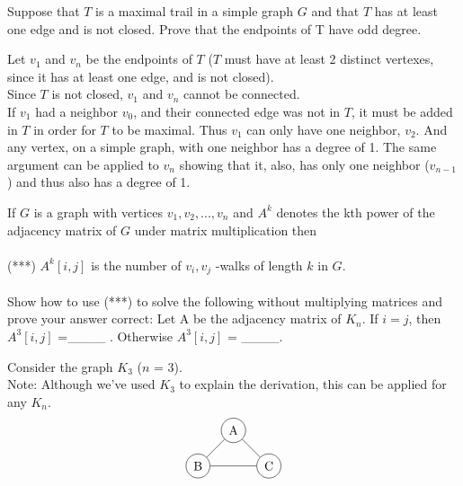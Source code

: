 \documentclass[12pt]{article}
\newenvironment{question}[2][Question]{\begin{trivlist}
\item[\hskip \labelsep {\bfseries #1}\hskip \labelsep {\bfseries #2.}]}{\end{trivlist}}
\begin{document}
\begin{question}{4}
Suppose that $T$ is a maximal trail in a simple graph $G$ and that $T$ has at least one edge and is not closed. Prove that the endpoints of T have odd degree.
\end{question}

Let $v_1$ and $v_n$ be the endpoints of $T$ ($T$ must have at least 2 distinct vertexes, since it has at least one edge, and is not closed). \\

Since $T$ is not closed, $v_1$ and $v_n$ cannot be connected. \\

If $v_1$ had a neighbor $v_0$, and their connected edge was not in $T$, it must be added in $T$ in order for $T$ to be maximal. Thus $v_1$ can only have one neighbor, $v_2$. And any vertex, on a simple graph, with one neighbor has a degree of 1. The same argument can be applied to $v_n$ showing that it, also, has only one neighbor ($v_{n-1}$) and thus also has a degree of 1. \\

\begin{question}{5}
If $G$ is a graph with vertices $v_1, v_2, . . . , v_n$ and $A^k$ denotes the kth power of the adjacency matrix
of $G$ under matrix multiplication then \\ \\

(***) $A^{k}[i, j]$ is the number of $v_i, v_j$ -walks of length $k$ in $G$. \\ \\

Show how to use (***) to solve the following without multiplying matrices and prove your answer
correct: Let A be the adjacency matrix of $K_n$. If $i = j$, then $A^3[i, j]$ =\_\_\_\_ . Otherwise
$A^{3}[i, j]$ = \_\_\_\_.
\end{question}

Consider the graph $K_3$ ($n$ = 3).\\
Note: Although we've used $K_3$ to explain the derivation, this can be applied for any $K_n$.
\begin{align*}
\begin{tikzpicture}
\node[shape=circle,draw=black] (A) at (1,1) {A};
\node[shape=circle,draw=black] (B) at (0,0) {B};
\node[shape=circle,draw=black] (C) at (2,0) {C};
\path [] (A) edge node[left] {} (B);
\path [] (A) edge node[left] {} (C);
\path [] (B) edge node[left] {} (C);
\end{tikzpicture}
\end{align*}
\end{document}
